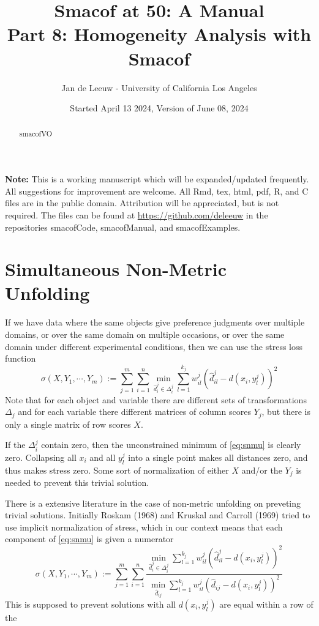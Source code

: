 \documentclass[
  12pt,
]{article}
\title{Smacof at 50: A Manual\\
Part 8: Homogeneity Analysis with Smacof}
\author{Jan de Leeuw - University of California Los Angeles}
\date{Started April 13 2024, Version of June 08, 2024}
\begin{document}
\maketitle
\begin{abstract}
smacofVO
\end{abstract}

{
\setcounter{tocdepth}{3}
\tableofcontents
}
\textbf{Note:} This is a working manuscript which will be expanded/updated
frequently. All suggestions for improvement are welcome. All Rmd, tex,
html, pdf, R, and C files are in the public domain. Attribution will be
appreciated, but is not required. The files can be found at
\url{https://github.com/deleeuw} in the repositories smacofCode, smacofManual,
and smacofExamples.

\section{Simultaneous Non-Metric Unfolding}\label{simultaneous-non-metric-unfolding}

If we have data where the same objects give preference
judgments over multiple domains, or over the same domain on multiple occasions, or over the same domain under different experimental conditions,
then we can use the stress loss function
\begin{equation}
\sigma(X,Y_1,\cdots,Y_m):=\sum_{j=1}^m\sum_{i=1}^n\min_{\hat d_i^j\in\Delta_i^j}\sum_{l=1}^{k_j}w_{il}^j(\hat d_{il}^j-d(x_i,y_l^j))^2
\label{eq:snmu}
\end{equation}
Note that for each object and variable there are different sets of transformations \(\Delta_j\)
and for each variable there different matrices of column scores \(Y_j\), but there is only a single matrix of row scores \(X\).

If the \(\Delta_i^j\) contain zero, then the unconstrained minimum of \eqref{eq:snmu}
is clearly zero. Collapsing all \(x_i\) and all \(y_l^j\) into a single point makes all distances zero, and thus makes stress zero. Some sort of normalization of either \(X\) and/or the \(Y_j\) is needed to prevent this trivial solution.

There is a extensive literature in the case of non-metric unfolding on preveting trivial solutions. Initially Roskam (1968) and Kruskal and Carroll (1969) tried to use implicit normalization of stress, which in our context means that
each component of \eqref{eq:snmu}
is given a numerator
\begin{equation}
\sigma(X,Y_1,\cdots,Y_m):=\sum_{j=1}^m\sum_{i=1}^n\frac{\min_{\hat d_i^j\in\Delta_i^j}\sum_{l=1}^{k_j}w_{il}^j(\hat d_{il}^j-d(x_i,y_l^j))^2}{\min_{\hat d_{ij}}\sum_{l=1}^{k_j}w_{il}^j(\hat d_{ij}-d(x_i,y_l^j))^2}
\label{eq:snmuin}
\end{equation}
This is supposed to prevent solutions with
all \(d(x_i,y_l^j)\) are equal within a row of
the
\end{document}
